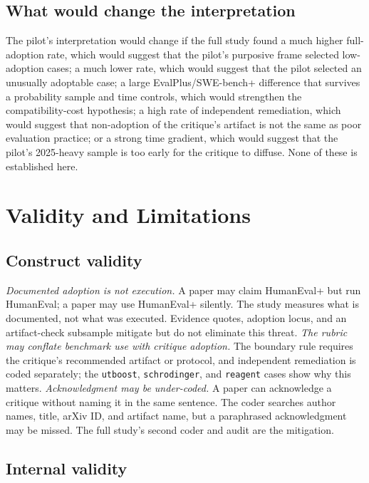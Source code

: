 \documentclass[11pt,a4paper]{article}
\newcommand{\key}[1]{\texttt{\small #1}}
\begin{document}
\subsection{What would change the interpretation}

The pilot's interpretation would change if the full study found a much higher full-adoption rate, which would suggest that the pilot's purposive frame selected low-adoption cases; a much lower rate, which would suggest that the pilot selected an unusually adoptable case; a large EvalPlus/SWE-bench+ difference that survives a probability sample and time controls, which would strengthen the compatibility-cost hypothesis; a high rate of independent remediation, which would suggest that non-adoption of the critique's artifact is not the same as poor evaluation practice; or a strong time gradient, which would suggest that the pilot's 2025-heavy sample is too early for the critique to diffuse. None of these is established here.

\section{Validity and Limitations}

\subsection{Construct validity}

\emph{Documented adoption is not execution.} A paper may claim HumanEval+ but run HumanEval; a paper may use HumanEval+ silently. The study measures what is documented, not what was executed. Evidence quotes, adoption locus, and an artifact-check subsample mitigate but do not eliminate this threat. \emph{The rubric may conflate benchmark use with critique adoption.} The boundary rule requires the critique's recommended artifact or protocol, and independent remediation is coded separately; the \key{utboost}, \key{schrodinger}, and \key{reagent} cases show why this matters. \emph{Acknowledgment may be under-coded.} A paper can acknowledge a critique without naming it in the same sentence. The coder searches author names, title, arXiv ID, and artifact name, but a paraphrased acknowledgment may be missed. The full study's second coder and audit are the mitigation.

\subsection{Internal validity}
\end{document}
